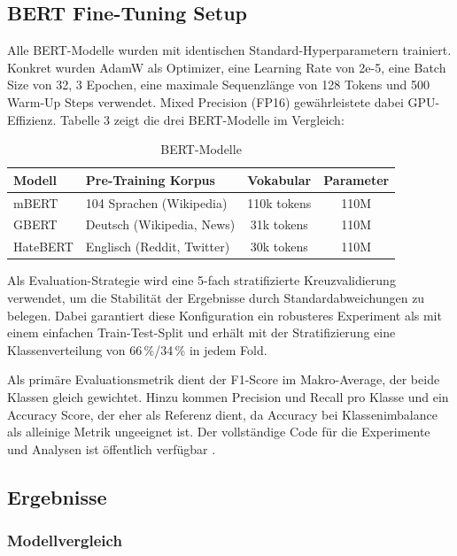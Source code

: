 ﻿\documentclass[11pt,a4paper]{article}
\begin{document}
\subsection{BERT Fine-Tuning Setup}

Alle BERT-Modelle wurden mit identischen Standard-Hyperparametern trainiert. Konkret wurden AdamW als Optimizer, eine Learning Rate von 2e-5, eine Batch Size von 32, 3 Epochen, eine maximale Sequenzlänge von 128 Tokens und 500 Warm-Up Steps verwendet. Mixed Precision (FP16) gewährleistete dabei GPU-Effizienz. Tabelle 3 zeigt die drei BERT-Modelle im Vergleich:

\begin{table}[h]
\centering
\small
\begin{tabular}{llcc}
\toprule
\textbf{Modell} & \textbf{Pre-Training Korpus} & \textbf{Vokabular} & \textbf{Parameter} \\
\midrule
mBERT & 104 Sprachen (Wikipedia) & 110k tokens & 110M \\
GBERT & Deutsch (Wikipedia, News) & 31k tokens & 110M \\
HateBERT & Englisch (Reddit, Twitter) & 30k tokens & 110M \\
\bottomrule
\end{tabular}
\caption{BERT-Modelle}
\end{table}

Als Evaluation-Strategie wird eine 5-fach stratifizierte Kreuzvalidierung verwendet, um die Stabilität der Ergebnisse durch Standardabweichungen zu belegen. Dabei garantiert diese Konfiguration ein robusteres Experiment als mit einem einfachen Train-Test-Split und erhält mit der Stratifizierung eine Klassenverteilung von 66\,\%/34\,\% in jedem Fold.

Als primäre Evaluationsmetrik dient der F1-Score im Makro-Average, der beide Klassen gleich gewichtet. Hinzu kommen Precision und Recall pro Klasse und ein Accuracy Score, der eher als Referenz dient, da Accuracy bei Klassenimbalance als alleinige Metrik ungeeignet ist. Der vollständige Code für die Experimente und Analysen ist öffentlich verfügbar \parencite{speier2026}.


\subsection{Ergebnisse}

\subsubsection{Modellvergleich}
\end{document}
